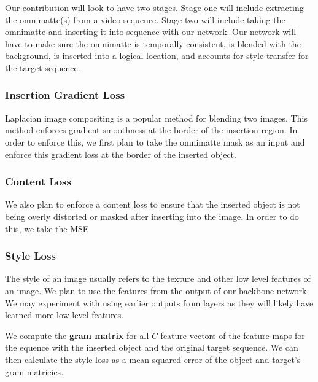 \documentclass{article}
\begin{document}

Our contribution will look to have two stages. Stage one will include extracting the omnimatte(s) from a video sequence. Stage two will include taking the omnimatte and inserting it into sequence with our network. Our network will have to make sure the omnimatte is temporally consistent, is blended with the background, is inserted into a logical location, and accounts for style transfer for the target sequence.


\subsubsection{Insertion Gradient Loss}
Laplacian image compositing is a popular method for blending two images. This method enforces gradient smoothness at the border of the insertion region. In order to enforce this, we first plan to take the omnimatte mask as an input and enforce this gradient loss at the border of the inserted object. 

\subsubsection{Content Loss}
We also plan to enforce a content loss to ensure that the inserted object is not being overly distorted or masked after inserting into the image. In order to do this, we take the MSE 

\subsubsection{Style Loss}
The style of an image usually refers to the texture and other low level features of an image. We plan to use the features from the output of our backbone network. We may experiment with using earlier outputs from layers as they will likely have learned more low-level features.

We compute the \textbf{gram matrix} for all $C$ feature vectors of the feature maps for the equence with the inserted object and the original target sequence. We can then calculate the style loss as a mean squared error of the object and target's gram matricies.
\end{document}
